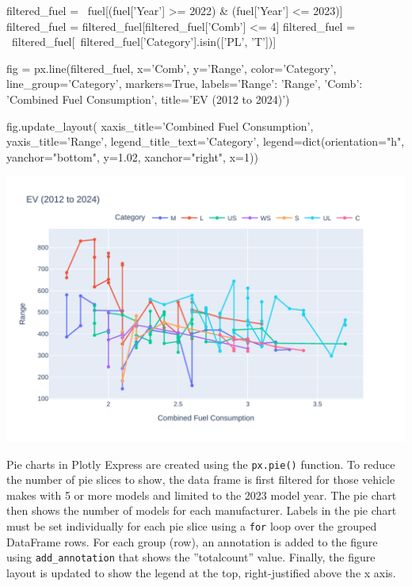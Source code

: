 \begin{samepage}
\begin{pythoncode}
filtered_fuel = \
    fuel[(fuel['Year'] >= 2022) & (fuel['Year'] <= 2023)]
filtered_fuel = filtered_fuel[filtered_fuel['Comb'] <= 4]
filtered_fuel = \
    filtered_fuel[~filtered_fuel['Category'].isin(['PL', 'T'])]

fig = px.line(filtered_fuel, 
    x='Comb', y='Range', color='Category', 
    line_group='Category', markers=True, 
    labels={'Range': 'Range', 'Comb': 'Combined Fuel Consumption'},
    title='EV (2012 to 2024)')

fig.update_layout(
    xaxis_title='Combined Fuel Consumption',
    yaxis_title='Range',
    legend_title_text='Category',
    legend=dict(orientation="h", yanchor="bottom", 
                y=1.02, xanchor="right", x=1))
\end{pythoncode}
\end{samepage}

\begin{center}
  \includegraphics[width=.8\textwidth]{px.fuel.linesPoints.pdf}
\end{center}

Pie charts in Plotly Express are created using the \texttt{px.pie()} function. To reduce the number of pie slices to show, the data frame is first filtered for those vehicle makes with 5 or more models and limited to the 2023 model year. The pie chart then shows the number of models for each manufacturer. Labels in the pie chart must be set individually for each pie slice using a \texttt{for} loop over the grouped DataFrame rows. For each group (row), an annotation is added to the figure using \texttt{add\_annotation} that shows the ''totalcount'' value. Finally, the figure layout is updated to show the legend at the top, right-justified above the x axis.

